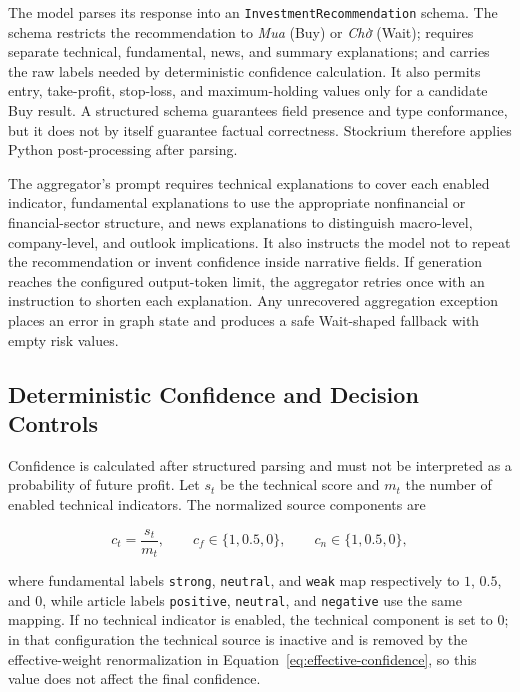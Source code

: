 The model parses its response into an \texttt{InvestmentRecommendation} schema. The schema restricts the recommendation to \textit{Mua} (Buy) or \textit{Chờ} (Wait); requires separate technical, fundamental, news, and summary explanations; and carries the raw labels needed by deterministic confidence calculation. It also permits entry, take-profit, stop-loss, and maximum-holding values only for a candidate Buy result. A structured schema guarantees field presence and type conformance, but it does not by itself guarantee factual correctness. Stockrium therefore applies Python post-processing after parsing.

The aggregator's prompt requires technical explanations to cover each enabled indicator, fundamental explanations to use the appropriate nonfinancial or financial-sector structure, and news explanations to distinguish macro-level, company-level, and outlook implications. It also instructs the model not to repeat the recommendation or invent confidence inside narrative fields. If generation reaches the configured output-token limit, the aggregator retries once with an instruction to shorten each explanation. Any unrecovered aggregation exception places an error in graph state and produces a safe Wait-shaped fallback with empty risk values.

\subsection{Deterministic Confidence and Decision Controls}
\label{subsec:analysis-deterministic-controls}

Confidence is calculated after structured parsing and must not be interpreted as a probability of future profit. Let $s_t$ be the technical score and $m_t$ the number of enabled technical indicators. The normalized source components are

\begin{equation}
    c_t = \frac{s_t}{m_t}, \qquad
    c_f \in \{1, 0.5, 0\}, \qquad
    c_n \in \{1, 0.5, 0\},
    \label{eq:confidence-components}
\end{equation}

where fundamental labels \texttt{strong}, \texttt{neutral}, and \texttt{weak} map respectively to $1$, $0.5$, and $0$, while article labels \texttt{positive}, \texttt{neutral}, and \texttt{negative} use the same mapping. If no technical indicator is enabled, the technical component is set to $0$; in that configuration the technical source is inactive and is removed by the effective-weight renormalization in Equation~\ref{eq:effective-confidence}, so this value does not affect the final confidence.

